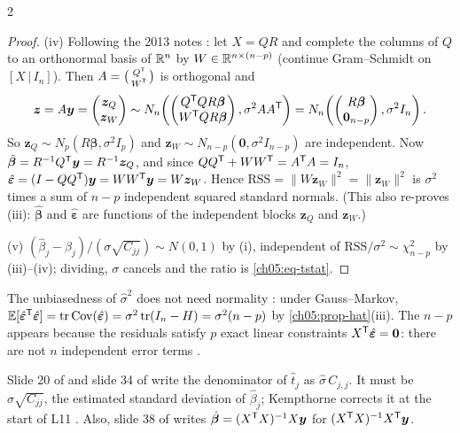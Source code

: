 \begin{paracol}{2}
\begin{proof}
(iv) Following the 2013 notes : let $X=QR$ and complete the columns of $Q$ to an orthonormal
basis of $\mathbb{R}^n$ by $W\in\mathbb{R}^{n\times(n-p)}$ (continue Gram--Schmidt on $[X\,|\,I_n]$). Then
$A=\bigl(\begin{smallmatrix}Q^{\mathsf T}\\ W^{\mathsf T}\end{smallmatrix}\bigr)$ is orthogonal and
\[
  \bm z=A\bm y=\begin{pmatrix}\bm z_Q\\ \bm z_W\end{pmatrix}\sim N_n\!\left(\begin{pmatrix}Q^{\mathsf T} QR\bm\beta\\ W^{\mathsf T} QR\bm\beta\end{pmatrix},\sigma^2AA^{\mathsf T}\right)
  =N_n\!\left(\begin{pmatrix}R\bm\beta\\ \bm 0_{n-p}\end{pmatrix},\sigma^2I_n\right).
\]
So $\bm z_Q\sim N_p(R\bm\beta,\sigma^2I_p)$ and $\bm z_W\sim N_{n-p}(\bm 0,\sigma^2I_{n-p})$ are independent. Now
$\hat{\bm\beta}=R^{-1}Q^{\mathsf T}\bm y=R^{-1}\bm z_Q$, and since $QQ^{\mathsf T}+WW^{\mathsf T}=A^{\mathsf T} A=I_n$,
$\hat{\bm\varepsilon}=(I-QQ^{\mathsf T})\bm y=WW^{\mathsf T}\bm y=W\bm z_W$. Hence $\text{RSS}=\|W\bm z_W\|^2=\|\bm z_W\|^2$ is $\sigma^2$ times a sum of $n-p$
independent squared standard normals. (This also re-proves (iii): $\hat{\bm\beta}$ and $\hat{\bm\varepsilon}$ are functions of the
independent blocks $\bm z_Q$ and $\bm z_W$.)

(v) $(\hat\beta_j-\beta_j)/(\sigma\sqrt{C_{jj}})\sim N(0,1)$ by (i), independent of $\text{RSS}/\sigma^2\sim\chi^2_{n-p}$ by (iii)--(iv);
dividing, $\sigma$ cancels and the ratio is \eqref{ch05:eq-tstat}.
\end{proof}

The unbiasedness of $\hat\sigma^2$ does not need normality : under Gauss--Markov,
$\mathbb{E}[\hat{\bm\varepsilon}^{\mathsf T}\hat{\bm\varepsilon}]=\operatorname{tr}\operatorname{Cov}(\hat{\bm\varepsilon})=\sigma^2\operatorname{tr}(I_n-H)=\sigma^2(n-p)$ by \cref{ch05:prop-hat}(iii). The
$n-p$ appears because the residuals satisfy $p$ exact linear constraints $X^{\mathsf T}\hat{\bm\varepsilon}=\bm 0$: there are not $n$
independent error terms .

\begin{coursenote}
Slide 20 of  and slide 34 of  write the denominator of $\hat t_j$ as
$\hat\sigma\,C_{j,j}$. It must be $\hat\sigma\sqrt{C_{jj}}$, the estimated standard deviation of $\hat\beta_j$; Kempthorne
corrects it at the start of L11 . Also, slide 38 of  writes
$\hat{\bm\beta}=(X^{\mathsf T} X)^{-1}X\bm y$ for $(X^{\mathsf T} X)^{-1}X^{\mathsf T}\bm y$.
\end{coursenote}


\end{paracol}

